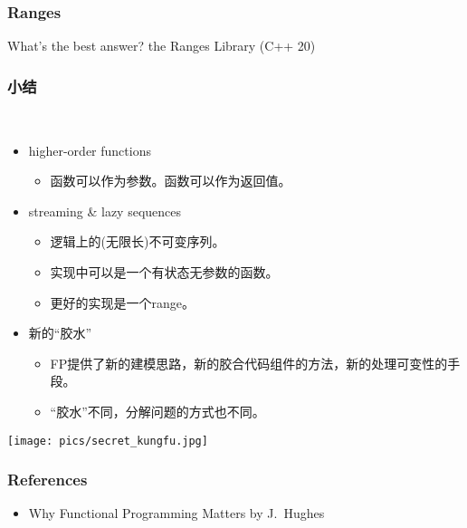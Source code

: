 \documentclass[UTF8,lualatex]{ctexbeamer}
\begin{document}

\begin{frame}
    \frametitle{Ranges}
    \begin{block}{What's the best answer?}
        the Ranges Library (C++ 20)
    \end{block}
\end{frame}


\begin{frame}
    \frametitle{小结}
    \begin{block}{~}
        \begin{itemize}
            \item higher-order functions
                \begin{itemize}
                    \item 函数可以作为参数。函数可以作为返回值。
                \end{itemize}
            \item streaming \& lazy sequences
                \begin{itemize}
                    \item 逻辑上的(无限长)不可变序列。
                    \item 实现中可以是一个有状态无参数的函数。
                    \item 更好的实现是一个range。
                \end{itemize}
            \item 新的“胶水”
                \begin{itemize}
                    \item FP提供了新的建模思路，新的胶合代码组件的方法，新的处理可变性的手段。
                    \item “胶水”不同，分解问题的方式也不同。
                \end{itemize}
        \end{itemize}
    \end{block}
\end{frame}

\begin{frame}[plain]
    \begin{center}
        \texttt{[image: pics/secret\_kungfu.jpg]}
    \end{center}
\end{frame}

\begin{frame}
    \frametitle{References}
    \begin{itemize}
        \item Why Functional Programming Matters by J.\ Hughes
    \end{itemize}
\end{frame}
\end{document}
